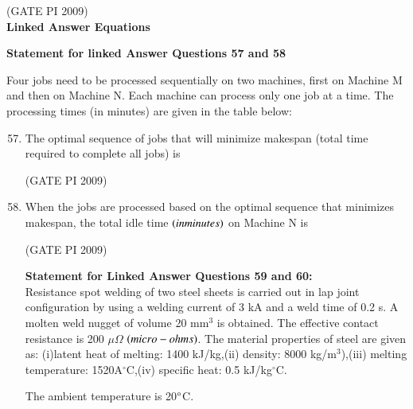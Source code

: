 \documentclass[journal,12pt,onecolumn]{IEEEtran}
\theoremstyle{remark}
\begin{document}
\hfill (GATE PI 2009) \\
\textbf{\large{Linked Answer Equations}}

\textbf{Statement for linked Answer Questions 57 and 58}

 Four jobs need to be processed sequentially on two machines, first on Machine M and then on Machine N. Each machine can process only one job at a time. The processing times (in minutes) are given in the table below:

\begin{enumerate}
\setcounter{enumi}{56}
\item The optimal sequence of jobs that will minimize makespan (total time required to complete all jobs) is 
\begin{enumerate}
\end{enumerate}
\hfill (GATE PI 2009)
\item When the jobs are processed based on the optimal sequence that minimizes makespan, the total idle time $\left(in minutes\right)$ on Machine N is
\begin{enumerate}
\end{enumerate}

\hfill (GATE PI 2009)

\textbf{Statement for Linked Answer Questions 59 and 60:} \\
Resistance spot welding of two steel sheets is carried out in lap joint configuration by using a welding current of 3 kA and a weld time of 0.2 s. A molten weld nugget of volume 20 mm$^3$ is obtained. The effective contact resistance is 200 $\mu\Omega$ $\left(micro-ohms\right)$. The material properties of steel are given as: (i)latent heat of melting: 1400 kJ/kg,(ii) density: 8000 kg/m$^3$),(iii) melting temperature: 1520A$^\circ$C,(iv) specific heat: 0.5 kJ/kg$^\circ$C.

The ambient temperature is 20$\degree$C. 



\end{enumerate}
\end{document}
